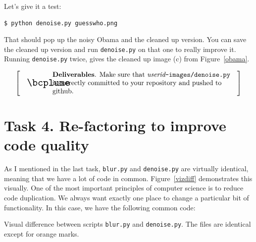 \documentclass[titlepage]{tufte-book}
\makeatletter
\newcommand{\figref}[1]{Figure~\ref{#1}}
\newenvironment{callout}[1]{
\[
  \left[
      \begin{tabular}{@{\quad}m{.05\textwidth}@{\qquad}m{.75\textwidth}@{\quad}}
        \scalebox{1.5}{#1} & 
          \raggedright%
}
{
      \end{tabular}
    \right]
\]
}
\makeatother
\begin{document}
Let's give it a test:

\begin{lstlisting}[style=BashInputStyle]
$ python denoise.py guesswho.png
\end{lstlisting}

\noindent That should pop up the noisy Obama and the cleaned up version. You can save the cleaned up version and run {\tt denoise.py} on that one to really improve it. Running {\tt denoise.py} twice, gives the cleaned up image (c) from \figref{obama}.  

\begin{callout}{\bcplume}
{\bf Deliverables}. Make sure that {\em userid}{\tt -images/denoise.py} is correctly committed to your repository and pushed to github. 
\end{callout}

\vspace{10mm}
\section{Task 4. Re-factoring to improve code quality}

As I mentioned in the last task, {\tt blur.py} and {\tt denoise.py} are virtually identical, meaning that we have a lot of code in common. \figref{vizdiff} demonstrates this visually. One of the most important principles of computer science is to reduce code duplication. We always want exactly one place to change a particular bit of functionality.   In this case, we have the following common code:

\begin{marginfigure}
\begin{center}
\end{center}
\caption{Visual difference between scripts {\tt blur.py} and {\tt denoise.py}. The files are identical except for orange marks.}
\label{vizdiff}
\end{marginfigure}
\end{document}
